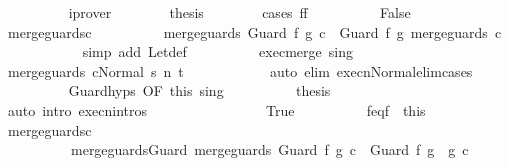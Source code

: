 \begin{isabellebody}
\ \ \ \ \ \ \ \ \isamarkupfalse%
\ iprover\isanewline
\ \ \ \ \ \ \isamarkupfalse%
\ {\isacharquery}thesis\isanewline
\ \ \ \ \ \ \isamarkupfalse%
\ {\isacharparenleft}cases\ {\isachardoublequoteopen}f{\isacharequal}f{\isacharprime}{\isachardoublequoteclose}{\isacharparenright}\isanewline
\ \ \ \ \ \ \ \ \isamarkupfalse%
\ False\isanewline
\ \ \ \ \ \ \ \ \isamarkupfalse%
\ merge{\isacharunderscore}guards{\isacharunderscore}c\isanewline
\ \ \ \ \ \ \ \ \isamarkupfalse%
\ {\isachardoublequoteopen}merge{\isacharunderscore}guards\ {\isacharparenleft}Guard\ f\ g\ c{\isacharparenright}\ {\isacharequal}\ Guard\ f\ g\ {\isacharparenleft}merge{\isacharunderscore}guards\ c{\isacharparenright}{\isachardoublequoteclose}\isanewline
\ \ \ \ \ \ \ \ \ \ \isamarkupfalse%
\ {\isacharparenleft}simp\ add{\isacharcolon}\ Let{\isacharunderscore}def{\isacharparenright}\isanewline
\ \ \ \ \ \ \ \ \isamarkupfalse%
\ exec{\isacharunderscore}merge\ s{\isacharunderscore}in{\isacharunderscore}g\isanewline
\ \ \ \ \ \ \ \ \isamarkupfalse%
\ {\isachardoublequoteopen}{\isasymGamma}{\isasymturnstile}{\isasymlangle}merge{\isacharunderscore}guards\ c{\isacharcomma}Normal\ s{\isasymrangle}\ {\isacharequal}n{\isasymRightarrow}\ t{\isachardoublequoteclose}\isanewline
\ \ \ \ \ \ \ \ \ \ \isamarkupfalse%
\ {\isacharparenleft}auto\ elim{\isacharcolon}\ execn{\isacharunderscore}Normal{\isacharunderscore}elim{\isacharunderscore}cases{\isacharparenright}\isanewline
\ \ \ \ \ \ \ \ \isamarkupfalse%
\ Guard{\isachardot}hyps\ {\isacharbrackleft}OF\ this{\isacharbrackright}\ s{\isacharunderscore}in{\isacharunderscore}g\isanewline
\ \ \ \ \ \ \ \ \isamarkupfalse%
\ {\isacharquery}thesis\isanewline
\ \ \ \ \ \ \ \ \ \ \isamarkupfalse%
\ {\isacharparenleft}auto\ intro{\isacharcolon}\ execn{\isachardot}intros{\isacharparenright}\isanewline
\ \ \ \ \ \ \isamarkupfalse%
\isanewline
\ \ \ \ \ \ \ \ \isamarkupfalse%
\ True\isanewline
\ \ \ \ \ \ \ \ \isamarkupfalse%
\ f{\isacharunderscore}eq{\isacharunderscore}f{\isacharprime}\ {\isacharequal}\ this\isanewline
\ \ \ \ \ \ \ \ \isamarkupfalse%
\ merge{\isacharunderscore}guards{\isacharunderscore}c\ \isamarkupfalse%
\ \isanewline
\ \ \ \ \ \ \ \ \ \ merge{\isacharunderscore}guards{\isacharunderscore}Guard{\isacharcolon}\ {\isachardoublequoteopen}merge{\isacharunderscore}guards\ {\isacharparenleft}Guard\ f\ g\ c{\isacharparenright}\ {\isacharequal}\ Guard\ f\ {\isacharparenleft}g\ {\isasyminter}\ g{\isacharprime}{\isacharparenright}\ c{\isacharprime}{\isachardoublequoteclose}\isanewline

\end{isabellebody}
